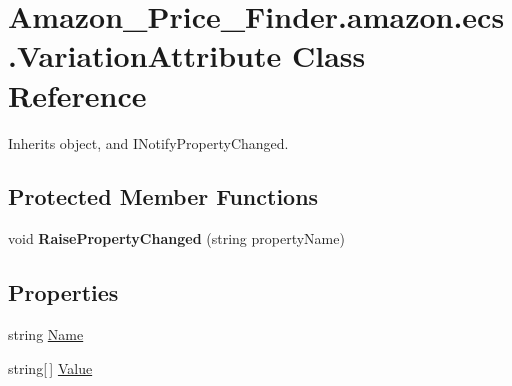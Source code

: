 \hypertarget{class_amazon___price___finder_1_1amazon_1_1ecs_1_1_variation_attribute}{\section{Amazon\-\_\-\-Price\-\_\-\-Finder.\-amazon.\-ecs.\-Variation\-Attribute Class Reference}
\label{class_amazon___price___finder_1_1amazon_1_1ecs_1_1_variation_attribute}
}


 




Inherits object, and I\-Notify\-Property\-Changed.

\subsection*{Protected Member Functions}
\begin{DoxyCompactItemize}
\item 
\hypertarget{class_amazon___price___finder_1_1amazon_1_1ecs_1_1_variation_attribute_a950fbd51ae3f4a4888146e67df615fc0}{void {\bfseries Raise\-Property\-Changed} (string property\-Name)}\label{class_amazon___price___finder_1_1amazon_1_1ecs_1_1_variation_attribute_a950fbd51ae3f4a4888146e67df615fc0}

\end{DoxyCompactItemize}
\subsection*{Properties}
\begin{DoxyCompactItemize}
\item 
\hypertarget{class_amazon___price___finder_1_1amazon_1_1ecs_1_1_variation_attribute_a68acf555755962e3fca5cce15c6ee8e1}{string \hyperlink{class_amazon___price___finder_1_1amazon_1_1ecs_1_1_variation_attribute_a68acf555755962e3fca5cce15c6ee8e1}{Name}}\label{class_amazon___price___finder_1_1amazon_1_1ecs_1_1_variation_attribute_a68acf555755962e3fca5cce15c6ee8e1}

\begin{DoxyCompactList}\small\item\em \end{DoxyCompactList}\item 
\hypertarget{class_amazon___price___finder_1_1amazon_1_1ecs_1_1_variation_attribute_a5900ff8afc55a8613059da0063c09159}{string\mbox{[}$\,$\mbox{]} \hyperlink{class_amazon___price___finder_1_1amazon_1_1ecs_1_1_variation_attribute_a5900ff8afc55a8613059da0063c09159}{Value}}\label{class_amazon___price___finder_1_1amazon_1_1ecs_1_1_variation_attribute_a5900ff8afc55a8613059da0063c09159}

\begin{DoxyCompactList}\small\item\em \end{DoxyCompactList}\end{DoxyCompactItemize}
